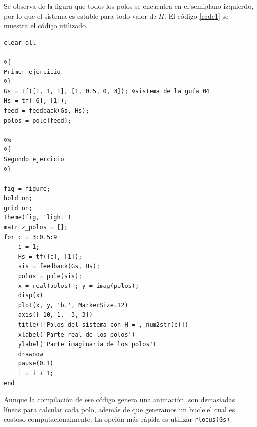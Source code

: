 Se observa de la figura que todos los polos se encuentra en el semiplano izquierdo, por lo que el sistema es estable para todo valor de $H$. El código \ref{code1} se muestra el código utilizado.

\begin{lstlisting}[caption = {Código MATLAB para generar el lugar de raíces del sistema $G$}, label = {code1}]
clear all

%{
Primer ejercicio
%}
Gs = tf([1, 1, 1], [1, 0.5, 0, 3]); %sistema de la guía 04
Hs = tf([6], [1]);
feed = feedback(Gs, Hs);
polos = pole(feed);

%%
%{
Segundo ejercicio
%}

fig = figure;
hold on;
grid on;
theme(fig, 'light')
matriz_polos = [];
for c = 3:0.5:9
    i = 1;
    Hs = tf([c], [1]);
    sis = feedback(Gs, Hs);
    polos = pole(sis);
    x = real(polos) ; y = imag(polos);
    disp(x)
    plot(x, y, 'b.', MarkerSize=12)
    axis([-10, 1, -3, 3])
    title(['Polos del sistema con H =', num2str(c)])
    xlabel('Parte real de los polos')
    ylabel('Parte imaginaria de los polos')
    drawnow
    pause(0.1)
    i = i + 1;
end

\end{lstlisting}




Aunque la compilación de ese código genera una animación, son demasiadas líneas para calcular cada polo, además de que generamos un bucle el cual es costoso computacionalmente. La opción más rápida es utilizar \texttt{rlocus(Gs)}.